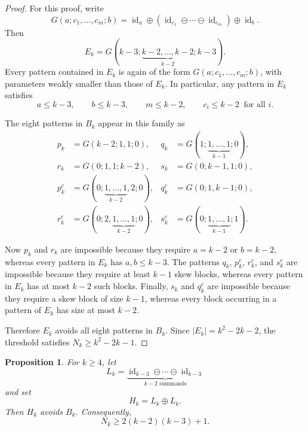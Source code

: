 \documentclass[11pt]{amsart}
\newcommand{\id}{\operatorname{id}}
\theoremstyle{plain}
\newtheorem{proposition}[theorem]{Proposition}
\theoremstyle{definition}
\theoremstyle{remark}
\begin{document}
\begin{proof}
  For this proof, write
  \[
    G(a;c_1,\dots,c_m;b)=\id_a \oplus (\id_{c_1}\ominus \cdots \ominus \id_{c_m}) \oplus \id_b.
  \]
  Then
  \[
    E_k=G(k-3;\underbrace{k-2,\dots,k-2}_{k-2};k-3).
  \]
  Every pattern contained in $E_k$ is again of the form $G(a;c_1,\dots,c_m;b)$, with parameters
  weakly smaller than those of $E_k$.  In particular, any pattern in $E_k$ satisfies
  \[
    a\leq k-3,\qquad b\leq k-3,\qquad m\leq k-2,\qquad c_i\leq k-2\ \text{ for all }i.
  \]

  The eight patterns in $B_k$ appear in this family as
  \begin{align*}
    p_k   & = G(k-2;1,1;0),                          &
    q_k   & = G(1;\underbrace{1,\dots,1}_{k-1};0),     \\
    r_k   & = G(0;1,1;k-2),                          &
    s_k   & = G(0;k-1,1;0),                            \\
    p_k^c & = G(0;\underbrace{1,\dots,1}_{k-2},2;0), &
    q_k^c & = G(0;1,k-1;0),                            \\
    r_k^c & = G(0;2,\underbrace{1,\dots,1}_{k-2};0), &
    s_k^c & = G(0;\underbrace{1,\dots,1}_{k-1};1).
  \end{align*}

  Now $p_k$ and $r_k$ are impossible because they require $a=k-2$ or $b=k-2$, whereas every pattern
  in $E_k$ has $a,b\leq k-3$.  The patterns $q_k$, $p_k^c$, $r_k^c$, and $s_k^c$ are impossible
  because they require at least $k-1$ skew blocks, whereas every pattern in $E_k$ has at most $k-2$
  such blocks.  Finally, $s_k$ and $q_k^c$ are impossible because they require a skew block of size
  $k-1$, whereas every block occurring in a pattern of $E_k$ has size at most $k-2$.

  Therefore $E_k$ avoids all eight patterns in $B_k$.  Since $|E_k|=k^2-2k-2$, the threshold
  satisfies $N_k \geq k^2-2k-1$.
\end{proof}

\begin{proposition}\label{prop:double-layered-lower-bound}
  For $k \geq 4$, let
  \[
    L_k=\underbrace{\id_{k-3}\ominus \cdots \ominus \id_{k-3}}_{k-2\text{ summands}}
  \]
  and set
  \[
    H_k=L_k\oplus L_k.
  \]
  Then $H_k$ avoids $B_k$.  Consequently,
  \[
    N_k \geq 2(k-2)(k-3)+1.
  \]
\end{proposition}
\end{document}
